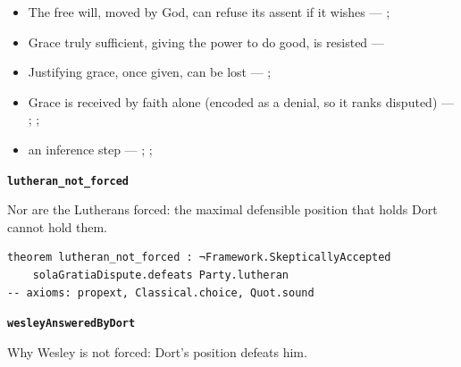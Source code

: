 \documentclass[11pt]{article}
\begin{document}
\begin{itemize}
\begin{itemize}
\item The free will, moved by God, can refuse its assent if it wishes --- \cite[Trent, Session VI (1547), canon 4]{tanner-decrees-1990}; \cite[45]{waterworth-trent-1848}
\item Grace truly sufficient, giving the power to do good, is resisted --- \cite[ch. VI]{garrigou-lagrange-grace-1952}
\item Justifying grace, once given, can be lost --- \cite[II-II q.24 a.11]{aquinas-summa-1920}; \cite[Trent, Session VI (1547), canon 23]{tanner-decrees-1990}
\item Grace is received by faith alone (encoded as a denial, so it ranks disputed) --- \cite[II-II q.4 a.3]{aquinas-summa-1920}; \cite[I-II q.113 a.4 ad 1]{aquinas-summa-1920}; \cite[Trent, Session VI (1547), canon 9]{tanner-decrees-1990}
\item an inference step --- \cite{pohle-molinism-1911}; \cite[I-II q.112 a.3]{aquinas-summa-1920}; \cite[ch. VII]{garrigou-lagrange-grace-1952}
\end{itemize}
\end{itemize}
\par\medskip\noindent\textbf{\texttt{lutheran\_\allowbreak{}not\_\allowbreak{}forced}}\par\nobreak\noindent
Nor are the Lutherans forced: the maximal defensible position that holds Dort cannot hold them.

{\small\begin{verbatim}
theorem lutheran_not_forced : ¬Framework.SkepticallyAccepted
    solaGratiaDispute.defeats Party.lutheran
-- axioms: propext, Classical.choice, Quot.sound
\end{verbatim}}
\par\medskip\noindent\textbf{\texttt{wesley\allowbreak{}Answered\allowbreak{}By\allowbreak{}Dort}}\par\nobreak\noindent
Why Wesley is not forced: Dort’s position defeats him.
\end{document}
